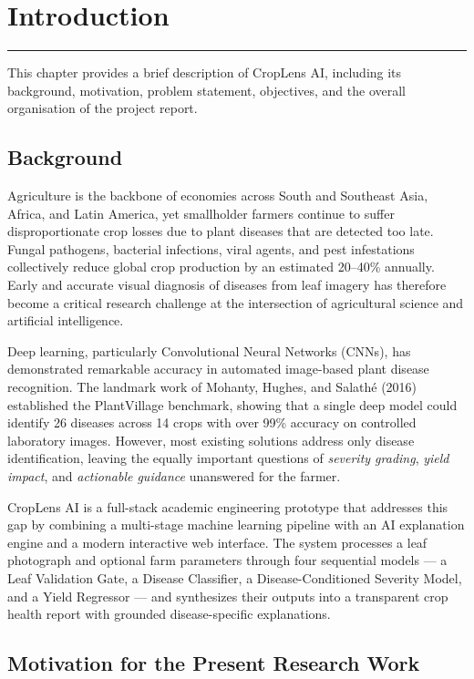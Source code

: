 \chapter{Introduction}
\noindent\rule{\linewidth}{2pt}
This chapter provides a brief description of CropLens AI, including its background, motivation, problem statement, objectives, and the overall organisation of the project report.

\section{Background}

Agriculture is the backbone of economies across South and Southeast Asia, Africa, and Latin America, yet smallholder farmers continue to suffer disproportionate crop losses due to plant diseases that are detected too late. Fungal pathogens, bacterial infections, viral agents, and pest infestations collectively reduce global crop production by an estimated 20--40\% annually. Early and accurate visual diagnosis of diseases from leaf imagery has therefore become a critical research challenge at the intersection of agricultural science and artificial intelligence.

Deep learning, particularly Convolutional Neural Networks (CNNs), has demonstrated remarkable accuracy in automated image-based plant disease recognition. The landmark work of Mohanty, Hughes, and Salath\'{e} (2016) established the PlantVillage benchmark, showing that a single deep model could identify 26 diseases across 14 crops with over 99\% accuracy on controlled laboratory images. However, most existing solutions address only disease identification, leaving the equally important questions of \textit{severity grading}, \textit{yield impact}, and \textit{actionable guidance} unanswered for the farmer.

CropLens AI is a full-stack academic engineering prototype that addresses this gap by combining a multi-stage machine learning pipeline with an AI explanation engine and a modern interactive web interface. The system processes a leaf photograph and optional farm parameters through four sequential models --- a Leaf Validation Gate, a Disease Classifier, a Disease-Conditioned Severity Model, and a Yield Regressor --- and synthesizes their outputs into a transparent crop health report with grounded disease-specific explanations.

\section{Motivation for the Present Research Work}

